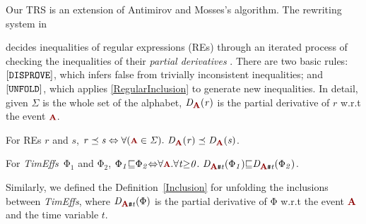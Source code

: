 \documentclass[acmsmall,10pt,review]{acmart}
\newcommand{\timedEffects}{\emph{TimEffs}}
\newcommand{\effect}{{\ensuremath{\mathrm{\Phi}}}}
\newcommand{\anyevent}[1]{{\textcolor{darkred}
{{\textbf{\footnotesize #1}}}}}
\newcommand{\code}[1]{{\tt{\ensuremath{\m{#1}}}}}
\newcommand{\codeme}[1]{{\tt{\ensuremath{#1}}}}
\newcommand{\CONTAIN}{\sqsubseteq}
\newcommand{\m}{\mathit}
\newcommand{\mysharp}{{\mathrel{\texttt{\#}}}}
\newcommand\tabref[1]{Table \textcolor{black}{\ref{#1}}.}
\newcommand\defref[1]{Definition~\textcolor{blue}{\ref{#1}}}
\begin{document}
Our TRS is 
an extension of Antimirov and Mosses's algorithm. The rewriting system in {\cite{DBLP:journals/tcs/AntimirovM95}  
decides inequalities of regular expressions (REs) through an iterated process of checking the inequalities of their 
\emph{partial derivatives} \cite{antimirov1995partial}. There are two basic rules: 
$\codeme{[DISPROVE]}$, which infers false from trivially inconsistent inequalities; and  
$\codeme{[UNFOLD]}$, which applies \autoref{RegularInclusion} to generate new inequalities.
In detail, given \code{\Sigma} is the whole set of the alphabet, 
\code{D_{\anyevent{A}}(r)} is the partial derivative of \code{r} w.r.t the event \code{\anyevent{A}}. 


\begin{definition}\label{RegularInclusion}  For REs \code{r} and \code{s}, \code{r \preceq s \Leftrightarrow \forall (\anyevent{A} \in \Sigma).\ D_{\anyevent{A}}(r) \preceq D_{\anyevent{A}}(s)}.
\end{definition}


\begin{definition}[\timedEffects\ Inclusion]\label{Inclusion}  %
For \timedEffects\ \code{\effect_1 } and \code{\effect_2}, 
\code{\effect_1 { \CONTAIN} \effect_2 {\Leftrightarrow} \forall \anyevent{A}. \forall t {\geq} 0.\ D_{\anyevent{A} \mysharp  t}(\effect_1)  
{\CONTAIN} D_{\anyevent{A} \mysharp  t}(\effect_2)}.
\end{definition}

Similarly, we defined the \defref{Inclusion} for unfolding the inclusions  
between \timedEffects, where \code{D_{\anyevent{A}\mysharp  t}(\effect)} 
is the partial derivative of \code{\effect} w.r.t the event 
\anyevent{A} and the time variable \code{t}. 









}
\end{document}
